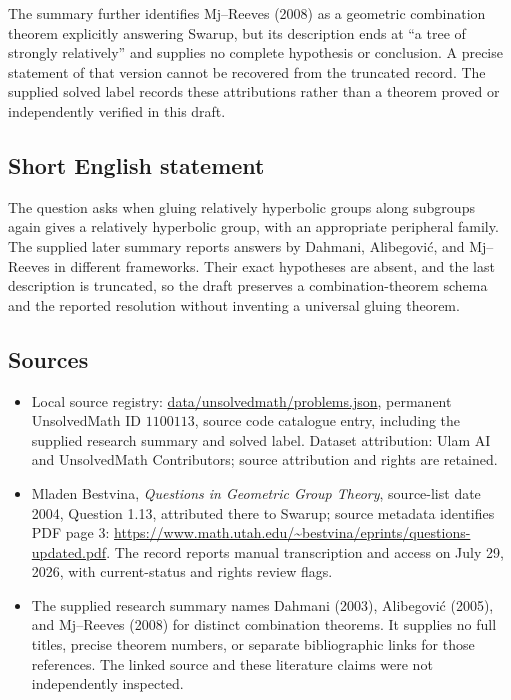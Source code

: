\documentclass[11pt]{article}
\begin{document}
The summary further identifies Mj--Reeves (2008) as a geometric combination theorem explicitly answering Swarup, but its description ends at ``a tree of strongly relatively'' and supplies no complete hypothesis or conclusion. A precise statement of that version cannot be recovered from the truncated record. The supplied solved label records these attributions rather than a theorem proved or independently verified in this draft.
\subsection{Short English statement}
The question asks when gluing relatively hyperbolic groups along subgroups again gives a relatively hyperbolic group, with an appropriate peripheral family. The supplied later summary reports answers by Dahmani, Alibegovi\'c, and Mj--Reeves in different frameworks. Their exact hypotheses are absent, and the last description is truncated, so the draft preserves a combination-theorem schema and the reported resolution without inventing a universal gluing theorem.
\subsection{Sources}
\begin{itemize}
\item Local source registry: \url{data/unsolvedmath/problems.json}, permanent UnsolvedMath ID $1100113$, source code catalogue entry, including the supplied research summary and solved label. Dataset attribution: Ulam AI and UnsolvedMath Contributors; source attribution and rights are retained.
\item Mladen Bestvina, \emph{Questions in Geometric Group Theory}, source-list date 2004, Question 1.13, attributed there to Swarup; source metadata identifies PDF page 3: \url{https://www.math.utah.edu/~bestvina/eprints/questions-updated.pdf}. The record reports manual transcription and access on July 29, 2026, with current-status and rights review flags.
\item The supplied research summary names Dahmani (2003), Alibegovi\'c (2005), and Mj--Reeves (2008) for distinct combination theorems. It supplies no full titles, precise theorem numbers, or separate bibliographic links for those references. The linked source and these literature claims were not independently inspected.
\end{itemize}
\end{document}
